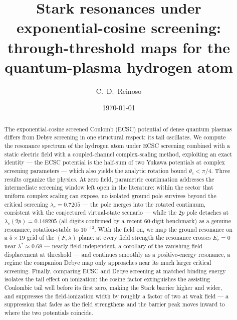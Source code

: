 \documentclass[aps,pre,twocolumn,superscriptaddress,floatfix,longbibliography]{revtex4-2}
\begin{document}
\title{Stark resonances under exponential-cosine screening: through-threshold
maps for the quantum-plasma hydrogen atom}

\author{C.~D.~Reinoso}

\date{\today}

\begin{abstract}
The exponential-cosine screened Coulomb (ECSC) potential of dense
quantum plasmas differs from Debye screening in one structural
respect: its tail oscillates. We compute the resonance spectrum of
the hydrogen atom under ECSC screening combined with a static
electric field with a coupled-channel complex-scaling method,
exploiting an exact identity --- the ECSC potential is the half-sum
of two Yukawa potentials at complex screening parameters --- which
also yields the analytic rotation bound $\theta_c<\pi/4$. Three
results organize the physics. At zero field, parametric continuation
addresses the intermediate screening window left open in the
literature: within the sector that uniform complex scaling can
expose, no isolated ground pole survives beyond the critical
screening $\lambda_c=0.7205$ --- the pole merges into the rotated
continuum, consistent with the conjectured virtual-state scenario
--- while the $2p$ pole detaches at $\lambda_c(2p)=0.148205$ (all
digits confirmed by a recent 60-digit benchmark) as a genuine
resonance, rotation-stable to $10^{-13}$. With the field on, we map
the ground resonance on a $5\times19$ grid of the $(F,\lambda)$
plane: at every field strength the resonance crosses $E_r=0$ near
$\lambda^{*}\approx0.68$ --- nearly field-independent, a corollary
of the vanishing field displacement at threshold --- and continues
smoothly as a positive-energy resonance, a regime the companion
Debye map only approaches near its much larger critical screening.
Finally, comparing ECSC and Debye screening at matched binding
energy isolates the tail effect on ionization: the cosine factor
extinguishes the assisting Coulombic tail well before its first
zero, making the Stark barrier higher and wider, and suppresses the
field-ionization width by roughly a factor of two at weak field ---
a suppression that fades as the field strengthens and the barrier
peak moves inward to where the two potentials coincide.
\end{abstract}

\maketitle
\end{document}
